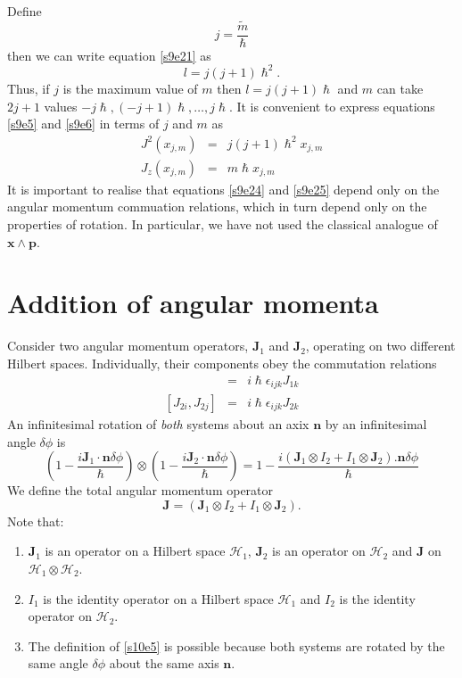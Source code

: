 \documentclass{article}
\numberwithin{equation}{section}
\let\vec\bm
\theoremstyle{plain}
\numberwithin{thm}{section}
\theoremstyle{plain}
\numberwithin{prop}{section}
\theoremstyle{definition}
\numberwithin{defn}{section}
\theoremstyle{remark}
\begin{document}
Define
\begin{equation}\label{s9e22}
j = \frac{\tilde{m}}{\hslash}
\end{equation}
then we can write equation \eqref{s9e21} as
\begin{equation}\label{s9e23}
l = j(j + 1)\hslash^2.
\end{equation}
Thus, if $j$ is the maximum value of $m$ then $l = j(j+1)\hslash$ and $m$ can
take $2j+1$ values $-j\hslash, (-j + 1)\hslash, \ldots, j\hslash$. It is 
convenient to express equations \eqref{s9e5} and \eqref{s9e6} in terms of $j$
and $m$ as 
\begin{eqnarray}
J^2(x_{j,m}) &=& j(j + 1)\hslash^2 x_{j, m} \label{s9e24} \\
J_z(x_{j,m}) &=& m\hslash x_{j, m} \label{s9e25}
\end{eqnarray}
It is important to realise that equations \eqref{s9e24} and \eqref{s9e25}
depend only on the angular momentum commuation relations, which in turn depend
only on the properties of rotation. In particular, we have not used the 
classical analogue of $\vec{x} \wedge \vec{p}$.

\section{Addition of angular momenta}\label{s10}
Consider two angular momentum operators, $\vec{J}_1$ and $\vec{J}_2$, operating
on two different Hilbert spaces. Individually, their components obey the
commutation relations
\begin{eqnarray}
[J_{1i}, J_{1j}] &=& i\hslash \epsilon_{ijk}J_{1k} \label{s10e1} \\
{}[J_{2i}, J_{2j}] &=& i\hslash \epsilon_{ijk}J_{2k} \label{s10e2} 
\end{eqnarray}
An infinitesimal rotation of \emph{both} systems about an axix $\vec{n}$ 
by an infinitesimal angle $\delta\phi$ is
\begin{equation}\label{s10e3}
\left(1 - \frac{i\vec{J}_1\cdot\vec{n}\delta\phi}{\hslash}\right) \otimes
\left(1 - \frac{i\vec{J}_2\cdot\vec{n}\delta\phi}{\hslash}\right)
= 1 - \frac{i(\vec{J}_1 \otimes I_2 + I_1 \otimes \vec{J}_2).\vec{n}\delta\phi}
{\hslash}
\end{equation}
We define the total angular momentum operator
\begin{equation}\label{s10e4}
\vec{J} = (\vec{J}_1 \otimes I_2 + I_1 \otimes \vec{J}_2).
\end{equation}
Note that:
\begin{enumerate}
\item $\vec{J}_1$ is an operator on a Hilbert space $\mathcal{H}_1$, $\vec{J}_2$
is an operator on $\mathcal{H}_2$ and $\vec{J}$ on $\mathcal{H}_1 \otimes
\mathcal{H}_2$.
\item $I_1$ is the identity operator on a Hilbert space $\mathcal{H}_1$
and $I_2$ is the identity operator on $\mathcal{H}_2$.
\item The definition of \eqref{s10e5} is possible because both systems 
are rotated by the same angle $\delta\phi$ about the same axis $\vec{n}$.
\end{enumerate}
\end{document}
